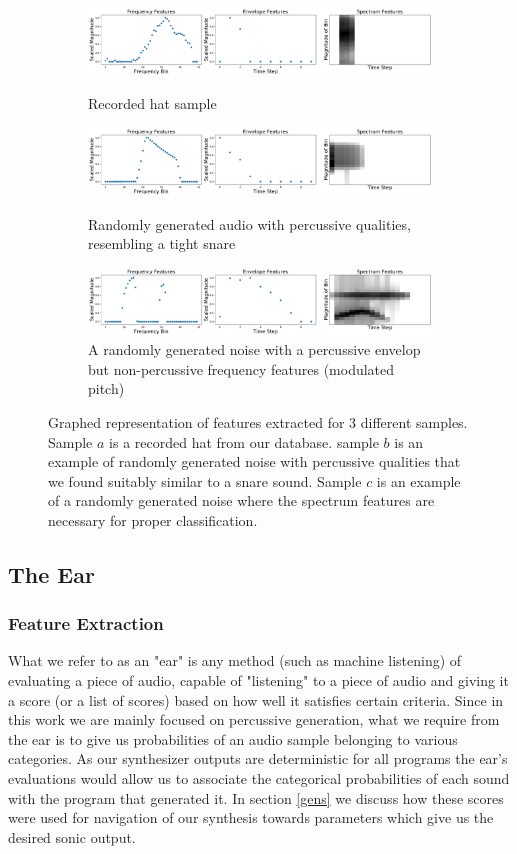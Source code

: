 \documentclass{nime-alternate} %
\begin{document}
\begin{figure}[h]
\centering
\begin{subfigure}[b]{\linewidth}
\includegraphics[width=1\linewidth]{images/ff1.pdf}
\caption{Recorded hat sample}\label{fig:64stack}
\setcounter{subfigure}{1}%
\includegraphics[width=1\linewidth]{images/ff2.pdf}
\caption{Randomly generated audio with percussive qualities, resembling a tight snare}\label{fig:64stack}
\setcounter{subfigure}{2}%
\includegraphics[width=1\linewidth]{images/ff3.pdf}
\caption{A randomly generated noise with a percussive envelop but non-percussive frequency features (modulated pitch)}\label{fig:64stack}
\setcounter{subfigure}{2}%
\end{subfigure}

\caption{Graphed representation of features extracted for 3 different samples. Sample $a$ is a recorded hat from our database. sample $b$ is an example of randomly generated noise with percussive qualities that we found suitably similar to a snare sound. Sample $c$ is an example of a randomly generated noise where the spectrum features are necessary for proper classification.}
\label{fig:stackspectrums}
\end{figure}

\subsection{The Ear}
\label{sec:ear}
\subsubsection{Feature Extraction}
What we refer to as an "ear" is any method (such as machine listening) of evaluating a piece of audio, capable of "listening" to a piece of audio and giving it a score (or a list of scores) based on how well it satisfies certain criteria. Since in this work we are mainly focused on percussive generation, what we require from the ear is to give us probabilities of an audio sample belonging to various categories. As our synthesizer outputs are deterministic for all programs the ear's evaluations would allow us to associate the categorical probabilities of each sound with the program that generated it. In section \ref{gens} we discuss how these scores were used for navigation of our synthesis towards parameters which give us the desired sonic output.
\end{document}
